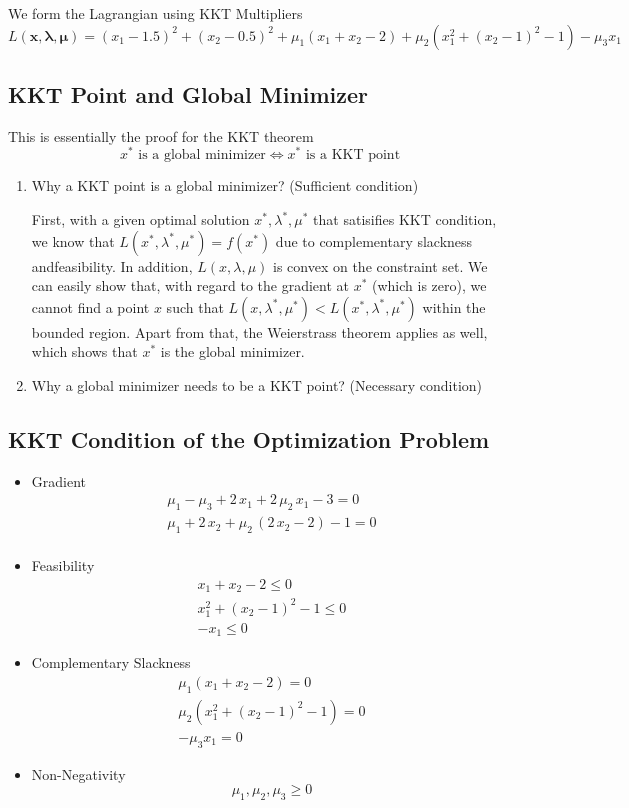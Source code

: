 We form the Lagrangian using KKT Multipliers
\[
L(\bm{x, \lambda, \mu}) = (x_1 - 1.5)^2 + (x_2 - 0.5)^2 + \mu_1 (x_1 + x_2 - 2) + \mu_2 (x_1^2 + (x_2 - 1)^2 - 1) - \mu_3 x_1
\]

\subsection{KKT Point and Global Minimizer}

This is essentially the proof for the KKT theorem
\[
\text{$x^*$ is a global minimizer} \iff \text{$x^*$ is a KKT point}
\]

\begin{enumerate}
\item Why a KKT point is a global minimizer? (Sufficient condition)
\par First, with a given optimal solution $x^*, \lambda^*, \mu^*$ that satisifies KKT condition, we know that $L(x^*, \lambda^*, \mu^*) = f(x^*)$ due to complementary slackness andfeasibility. In addition, $L(x, \lambda, \mu)$ is convex on the constraint set. We can easily show that, with regard to the gradient at $x^*$ (which is zero), we cannot find a point $x$ such that $L(x, \lambda^*, \mu^*) < L(x^*, \lambda^*, \mu^*)$ within the bounded region. Apart from that, the Weierstrass theorem applies as well, which shows that $x^*$ is the global minimizer. 

\item Why a global minimizer needs to be a KKT point? (Necessary condition)



\end{enumerate}

\subsection{KKT Condition of the Optimization Problem}

\begin{itemize}
\item Gradient
\[
\begin{array}{l}
\mu_1 -\mu_3 +2\,x_1 +2\,\mu_2 \,x_1 -3=0\\
\mu_1 +2\,x_2 +\mu_2 \,{\left(2\,x_2 -2\right)}-1=0\\
\end{array}
\]
\item Feasibility
\[
\begin{array}{l}
     x_1 + x_2 - 2 \leq 0 \\
     x_1^2 + (x_2 - 1)^2 - 1 \leq 0 \\
     - x_1 \leq 0
\end{array}
\]

\item Complementary Slackness
\[
\begin{array}{l}
     \mu_1(x_1 + x_2 - 2) = 0 \\
     \mu_2(x_1^2 + (x_2 - 1)^2 - 1) = 0 \\
     - \mu_3x_1 = 0
\end{array}
\]
\item Non-Negativity
\[
\mu_1, \mu_2, \mu_3 \geq 0
\]
\end{itemize}

